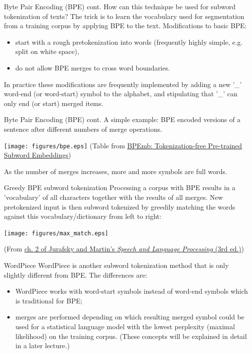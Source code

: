 \documentclass[style=upen, size=14pt]{powerdot}
\theoremstyle{definition}
\begin{document}
\begin{slide}[toc=]{Byte Pair Encoding (BPE) cont.}
  How can this technique be used for subword tokenization of texts? The trick is
  to learn the vocabulary used for segmentation from a training corpus by
  applying BPE to the text. Modifications to basic BPE:
  \begin{itemize}
  \item start with a rough pretokenization into words (frequently highly simple,
    e.g. split on white space),
  \item do not allow BPE merges to cross word boundaries.
  \end{itemize}
  In practice these modifications are frequently implemented by adding a new
  '\_' word-end (or word-start) symbol to the alphabet, and stipulating that
  '\_' can only end (or start) merged items.
\end{slide}

\begin{slide}[toc=]{Byte Pair Encoding (BPE) cont.}
  A simple example: BPE encoded versions of a sentence after different numbers
  of merge operations.
  \begin{center}
    \texttt{[image: figures/bpe.eps]}
    \footnotesize(Table from \href{http://www.lrec-conf.org/proceedings/lrec2018/pdf/1049.pdf}{BPEmb: Tokenization-free Pre-trained Subword Embeddings})
  \end{center}
  As the number of merges increases, more and more symbols are full words.
\end{slide}

\begin{slide}[toc=]{Greedy BPE subword tokenization}
  Processing a corpus with BPE results in a 'vocabulary' of all characters
  together with the results of all merges. New pretokenized input is then
  subword tokenized by greedily matching the words against this
  vocabulary/dictionary from left to right:

  \texttt{[image: figures/max\_match.eps]}
  
  \footnotesize(From \href{https://web.stanford.edu/~jurafsky/slp3/2.pdf}{ch. 2 of Jurafsky and Martin's \emph{Speech and Language
      Processing} (3rd ed.)})

  \end{slide}

\begin{slide}[toc=WordPiece]{WordPiece}
  WordPiece is another subword tokenization method that is only slightly
  different from BPE. The differences are:
  \begin{itemize}
  \item WordPiece works with word-start symbols instead of word-end symbols which is
    traditional for BPE;
  \item merges are performed depending on which resulting merged symbol could be
    used for a statistical language model with the lowest perplexity (maximal
    likelihood) on the training corpus. (These concepts will be explained in
    detail in a later lecture.)
  \end{itemize}
\end{slide}
\end{document}
